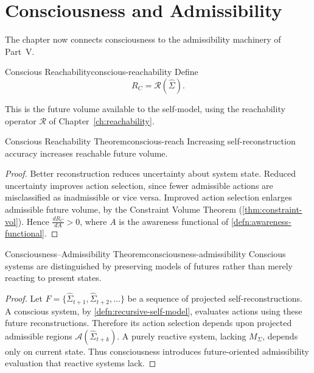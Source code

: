 \documentclass[12pt,twoside,openright]{book}
\newcommand{\reach}{\mathcal{R}}
\newcommand{\adm}{\mathcal{A}}
\begin{document}
\section{Consciousness and Admissibility}
\label{sec:ch21-admissibility}

The chapter now connects consciousness to the admissibility
machinery of Part~V.

\begin{definition}{Conscious Reachability}{conscious-reachability}
  Define
  \[
    R_C = \reach(\hat{\Sigma}).
  \]
\end{definition}

This is the future volume available to the self-model,
using the reachability operator $\reach$ of
Chapter~\ref{ch:reachability}.

\begin{theorem}{Conscious Reachability Theorem}{conscious-reach}
  Increasing self-reconstruction accuracy increases
  reachable future volume.
\end{theorem}

\begin{proof}
  Better reconstruction reduces uncertainty about system
  state. Reduced uncertainty improves action selection,
  since fewer admissible actions are misclassified as
  inadmissible or vice versa. Improved action selection
  enlarges admissible future volume, by the Constraint
  Volume Theorem (\cref{thm:constraint-vol}). Hence
  $\frac{dR_C}{dA} > 0$, where $A$ is the awareness
  functional of \cref{defn:awareness-functional}.
\end{proof}

\begin{theorem}{Consciousness--Admissibility Theorem}{consciousness-admissibility}
  Conscious systems are distinguished by preserving models
  of futures rather than merely reacting to present states.
\end{theorem}

\begin{proof}
  Let $F = \{\hat{\Sigma}_{t+1}, \hat{\Sigma}_{t+2}, \ldots\}$
  be a sequence of projected self-reconstructions. A
  conscious system, by \cref{defn:recursive-self-model},
  evaluates actions using these future reconstructions.
  Therefore its action selection depends upon projected
  admissible regions $\adm(\hat{\Sigma}_{t+k})$. A purely
  reactive system, lacking $M_\Sigma$, depends only on
  current state. Thus consciousness introduces
  future-oriented admissibility evaluation that reactive
  systems lack.
\end{proof}
\end{document}
